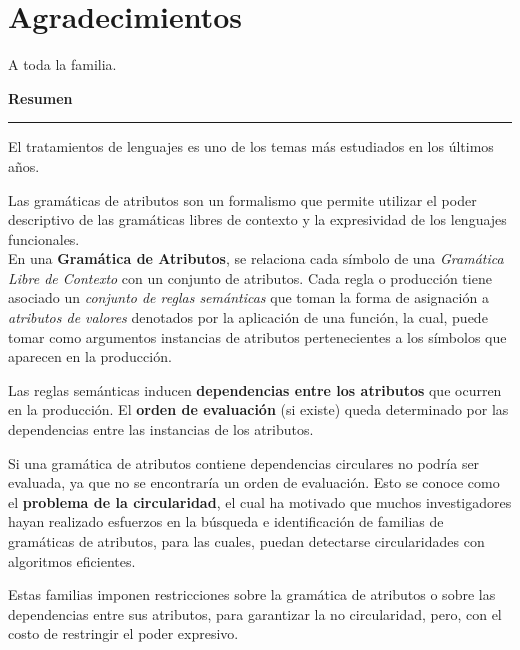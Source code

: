 \documentclass[a4paper,12pt]{ThesisStyle}
\begin{document}


\dominitoc


\cleardoublepage

\section*{Agradecimientos}

A toda la familia.

\cleardoublepage

\begin{vcenterpage}

{\large\textbf{Resumen\\}}
\noindent\rule[2pt]{\textwidth}{0.5pt}

El tratamientos de lenguajes es uno de los temas más estudiados en los últimos años.

Las gramáticas de atributos son un formalismo que permite utilizar el poder descriptivo de las gramáticas libres de contexto y la expresividad de los lenguajes funcionales.\\ 

En una \textbf{Gramática de Atributos}, se relaciona cada símbolo de una \textit{Gramática Libre de Contexto} con un conjunto de atributos. Cada regla o producción tiene asociado un \textit{conjunto de reglas semánticas} que toman la forma de asignación a \textit{atributos de valores} denotados por la aplicación de una función, la cual, puede tomar como argumentos instancias de atributos pertenecientes a los símbolos que aparecen en la producción.

Las reglas semánticas inducen \textbf{dependencias entre los atributos} que ocurren en la producción. El \textbf{orden de evaluación} (si existe) queda determinado por las dependencias entre las instancias de los atributos.

Si una gramática de atributos contiene dependencias circulares no podría ser evaluada, ya que no se encontraría un orden de evaluación. Esto se conoce como el \textbf{problema de la circularidad}, el cual ha motivado que muchos investigadores hayan realizado esfuerzos en la búsqueda e identificación de familias de gramáticas de atributos, para las cuales, puedan detectarse circularidades con algoritmos eficientes.

Estas familias imponen restricciones sobre la gramática de atributos o sobre las dependencias entre sus atributos, para garantizar la no circularidad, pero, con el costo de restringir el poder expresivo.


\end{vcenterpage}
\end{document}
